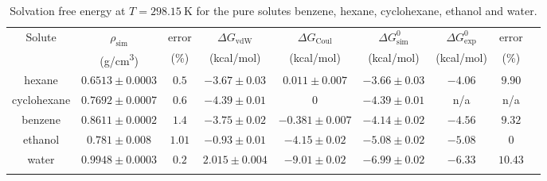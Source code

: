 \documentclass[3p,twocolumn]{elsarticle}
\begin{document}
\begin{table}
	\centering
	\caption{Solvation free energy at $T = 298.15~\text{K}$ for the pure solutes benzene, hexane, cyclohexane, ethanol and water.}
	\begin{adjustbox}{max width=\textwidth}
		\begin{tabular}{ccccccccc}
			\hline\hline
			Solute & $\rho_\text{sim}$ & error & $\Delta G_\text{vdW}$  & $\Delta G_\text{Coul}$  & $\Delta G^0_\text{sim}$ & $\Delta G^0_\text{exp}$   & error \\
			& (g/cm\textsuperscript{3}) & (\%) & (kcal/mol) &  (kcal/mol) &  (kcal/mol)   & (kcal/mol)   & (\%) \\
			\hline
			hexane & $0.6513 \pm 0.0003$ & $0.5$ & $-3.67  \pm  0.03$ & $0.011 \pm 0.007$ & $-3.66 \pm 0.03$ & $-4.06$ & $9.90$ \\
			cyclohexane & $0.7692 \pm 0.0007$ & $0.6$ & $-4.39 \pm 0.01$ & $0$ & $-4.39 \pm 0.01$ & n/a & n/a  \\
			benzene & $0.8611 \pm 0.0002$ & $1.4$ & $-3.75  \pm 0.02$ & $-0.381 \pm 0.007$ & $-4.14 \pm 0.02$ & $-4.56$ & $9.32$  \\
			ethanol & $0.781 \pm 0.008$ & $1.01$  & $-0.93 \pm 0.01$ & $-4.15 \pm 0.02$  & $-5.08  \pm 0.02$  & $-5.08$ & $0$ \\
			water & $0.9948 \pm 0.0003$ & $0.2$ & $2.015 \pm 0.004$ & $-9.01 \pm 0.02$ & $-6.99 \pm 0.02$ & $-6.33$  & $10.43$ \\
			\hline\hline
			\label{table:mu_solutes} 
		\end{tabular}
	\end{adjustbox}
\end{table}
\end{document}

